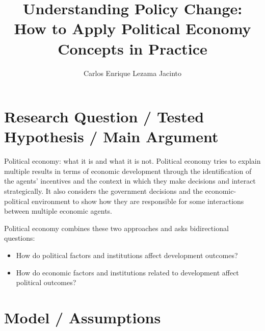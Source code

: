 \documentclass[9pt,twocolumn,twoside,]{pnas-new}
\title{Understanding Policy Change: How to Apply Political Economy
Concepts in Practice}
\author[]{Carlos Enrique Lezama Jacinto}
\affil[]{Instituto Tecnológico Autónomo de México}
\providecommand{\tightlist}{%
  \setlength{\itemsep}{0pt}\setlength{\parskip}{0pt}}
\begin{document}
\verticaladjustment{-2pt}



\maketitle
\thispagestyle{firststyle}


\acknow{}

\hypertarget{research-question-tested-hypothesis-main-argument}{%
\section*{Research Question / Tested Hypothesis / Main
Argument}\label{research-question-tested-hypothesis-main-argument}}

Political economy: what it is and what it is not. Political economy
tries to explain multiple results in terms of economic development
through the identification of the agents' incentives and the context in
which they make decisions and interact strategically. It also considers
the government decisions and the economic-political environment to show
how they are responsible for some interactions between multiple economic
agents.

Political economy combines these two approaches and asks bidirectional
questions:

\begin{itemize}
\tightlist
\item
  How do political factors and institutions affect development outcomes?
\item
  How do economic factors and institutions related to development affect
  political outcomes?
\end{itemize}

\hypertarget{model-assumptions}{%
\section*{Model / Assumptions}\label{model-assumptions}}
\end{document}

